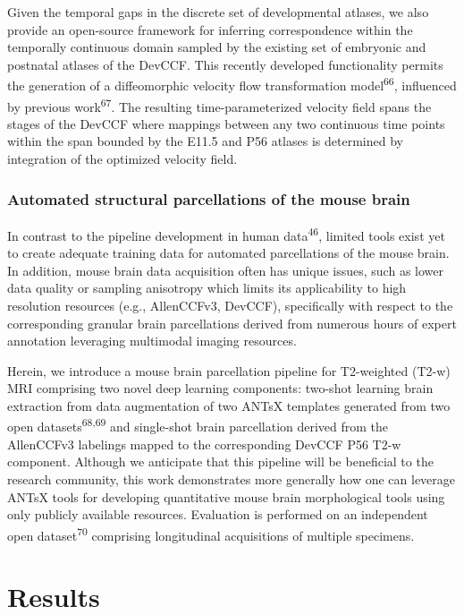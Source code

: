 \documentclass[
  12pt,
]{article}
\begin{document}
Given the temporal gaps in the discrete set of developmental atlases, we
also provide an open-source framework for inferring correspondence
within the temporally continuous domain sampled by the existing set of
embryonic and postnatal atlases of the DevCCF. This recently developed
functionality permits the generation of a diffeomorphic velocity flow
transformation model\textsuperscript{66}, influenced by previous
work\textsuperscript{67}. The resulting time-parameterized velocity
field spans the stages of the DevCCF where mappings between any two
continuous time points within the span bounded by the E11.5 and P56
atlases is determined by integration of the optimized velocity field.

\subsubsection{Automated structural parcellations of the mouse
brain}\label{automated-structural-parcellations-of-the-mouse-brain}

In contrast to the pipeline development in human
data\textsuperscript{46}, limited tools exist yet to create adequate
training data for automated parcellations of the mouse brain. In
addition, mouse brain data acquisition often has unique issues, such as
lower data quality or sampling anisotropy which limits its applicability
to high resolution resources (e.g., AllenCCFv3, DevCCF), specifically
with respect to the corresponding granular brain parcellations derived
from numerous hours of expert annotation leveraging multimodal imaging
resources.

Herein, we introduce a mouse brain parcellation pipeline for T2-weighted
(T2-w) MRI comprising two novel deep learning components: two-shot
learning brain extraction from data augmentation of two ANTsX templates
generated from two open datasets\textsuperscript{68,69} and single-shot
brain parcellation derived from the AllenCCFv3 labelings mapped to the
corresponding DevCCF P56 T2-w component. Although we anticipate that
this pipeline will be beneficial to the research community, this work
demonstrates more generally how one can leverage ANTsX tools for
developing quantitative mouse brain morphological tools using only
publicly available resources. Evaluation is performed on an independent
open dataset\textsuperscript{70} comprising longitudinal acquisitions of
multiple specimens.

\clearpage
\newpage

\section{Results}\label{results}
\end{document}
